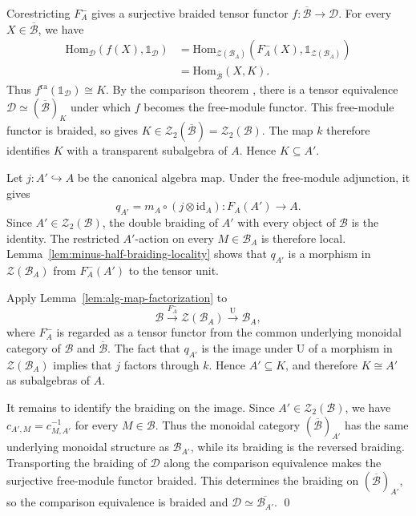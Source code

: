 \documentclass[11pt,reqno]{amsart}
\numberwithin{equation}{section}
\theoremstyle{plain}
\theoremstyle{definition}
\theoremstyle{remark}
\newcommand{\unit}{\mathds{1}}
\newcommand{\B}{\mathcal{B}}
\newcommand{\D}{\mathcal{D}}
\newcommand{\Z}{\mathcal{Z}}
\newcommand{\Hom}{\mathrm{Hom}}
\newcommand{\ra}{\mathrm{ra}}
\newcommand{\id}{\mathrm{id}}
\newcommand{\oB}{\overline{\B}}
\newcommand{\U}{\mathrm{U}}
\begin{document}
Corestricting $F_A^-$ gives a surjective braided tensor functor  
$f:\oB\longrightarrow\D$. 
For every $X\in\oB$, we have
\[
\begin{aligned}
  \Hom_{\D}(f(X),\unit_{\D})
  &=\Hom_{\Z(\B_A)}(F_A^-(X),\unit_{\Z(\B_A)})
  \\
  &=\Hom_{\oB}(X,K).
\end{aligned}
\]
Thus $f^{\ra}(\unit_{\D})\cong K$. By the comparison theorem
\cite[Proposition~6.6]{shimizu2026commutative}, there is a tensor equivalence
$\D\simeq(\oB)_K$ under which $f$ becomes the free-module functor. This
free-module functor is braided, so
\cite[Lemma~5.10]{shimizu2026commutative} gives
$K\in\Z_2(\oB)=\Z_2(\B)$. The map $k$ therefore identifies $K$ with a
transparent subalgebra of $A$. Hence $K\subseteq A'$.

Let $j:A'\hookrightarrow A$ be the canonical algebra map. Under
the free-module adjunction, it gives
\[
  q_{A'}=m_A\circ(j\otimes\id_A):F_A(A')\longrightarrow A.
\]
Since $A'\in\Z_2(\B)$, the double braiding of $A'$ with every object of $\B$
is the identity. The restricted $A'$-action on every $M\in\B_A$ is therefore
local. Lemma~\ref{lem:minus-half-braiding-locality} shows that $q_{A'}$ is a
morphism in $\Z(\B_A)$ from $F_A^-(A')$ to the tensor unit.

Apply Lemma~\ref{lem:alg-map-factorization} to
\[
  \B\xrightarrow{F_A^-}\Z(\B_A)\xrightarrow{\U}\B_A,
\]
where $F_A^-$ is regarded as a tensor functor from the common underlying
monoidal category of $\B$ and $\oB$. The fact that $q_{A'}$ is the image
under $\U$ of a morphism in $\Z(\B_A)$ implies that $j$ factors through
$k$. Hence $A'\subseteq K$, and therefore $K\cong A'$ as subalgebras of
$A$.

It remains to identify the braiding on the image. Since
$A'\in\Z_2(\B)$, we have $c_{A',M}=c_{M,A'}^{-1}$ for every $M\in\B$.
Thus the monoidal category $(\oB)_{A'}$ has the same
underlying monoidal structure as $\B_{A'}$, while its braiding is the
reversed braiding. Transporting the braiding of $\D$ along the comparison
equivalence makes the surjective free-module functor braided. This determines
the braiding on $(\oB)_{A'}$, so the comparison equivalence is braided and 
$\D\simeq\overline{\B_{A'}}$. \qed


\end{document}
